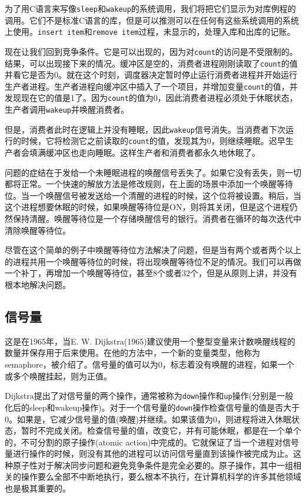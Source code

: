 	为了用C语言来写像\texttt{sleep}和\texttt{wakeup}的系统调用，我们将把它们显示为对库例程的调用。它们不是标准C语言的库，但是可以推测可以在任何有这些系统调用的系统上使用。\texttt{insert item}和\texttt{remove item}过程，未显示的，处理入库和出库的记账。
	
	现在让我们回到竞争条件。它是可以出现的，因为对\texttt{count}的访问是不受限制的。结果，可以出现接下来的情况。缓冲区是空的，消费者进程刚刚读取了\texttt{count}的值并看它是否为0。就在这个时刻，调度器决定暂时停止运行消费者进程并开始运行生产者进程。生产者进程向缓冲区中插入了一个项目，并增加变量\texttt{count}的值，并发现现在它的值是1了。因为\texttt{count}的值为0，因此消费者进程必须处于休眠状态，生产者调用\texttt{wakeup}并唤醒消费者。
	
	但是，消费者此时在逻辑上并没有睡眠，因此\texttt{wakeup}信号消失。当消费者下次运行的时候，它将检测它之前读取的\texttt{count}的值，发现其为0，则继续睡眠。迟早生产者会填满缓冲区也走向睡眠。这样生产者和消费者都永久地休眠了。
	
	问题的症结在于发给一个未睡眠进程的唤醒信号丢失了。如果它没有丢失，则一切都将正常。一个快速的解放方法是修改规则，在上面的场景中添加一个唤醒等待位。当一个唤醒信号被发送给一个清醒的进程的时候，这个位将被设置。稍后，当这个进程想要休眠的时候，如果唤醒等待位是ON，则将其关闭，但是这个进程仍然保持清醒。唤醒等待位是一个存储唤醒信号的银行。消费者在循环的每次迭代中清除唤醒等待位。
	
	尽管在这个简单的例子中唤醒等待位方法解决了问题，但是当有两个或者两个以上的进程共用一个唤醒等待位的时候，将出现唤醒等待位不足的情况。我们可以再做一个补丁，再增加一个唤醒等待位，甚至8个或者32个，但是从原则上讲，并没有根本地解决问题。
	
	\subsection{信号量}
	
	这是在1965年，当E. W. Dijkstra(1965)建议使用一个整型变量来计数唤醒线程的数量并保存用于后来使用。在他的方法中，一个新的变量类型，他称为semaphore，被介绍了。信号量的值可以为0，标志着没有唤醒的进程，如果一个或多个唤醒挂起，则为正值。
	
	Dijkstra提出了对信号量的两个操作，通常被称为\texttt{down}操作和\texttt{up}操作(分别是一般化后的sleep和wakeup操作)。对于一个信号量的\texttt{down}操作检查信号量的值是否大于0。如果是，它减少信号量的值(唤醒)并继续。如果该值为0，则进程将进入休眠状态，暂时不完成关闭。检查信号量的值，改变它，并有可能休眠，都是在一个单个的，不可分割的原子操作(atomic action)中完成的。它就保证了当一个进程对信号量进行操作的时候，则没有其他的进程可以访问信号量直到该操作被完成为止。这种原子性对于解决同步问题和避免竞争条件是完全必要的。原子操作，其中一组相关的操作要么全部不中断地执行，要么根本不执行，在计算机科学的许多其他领域也是极其重要的。
	
